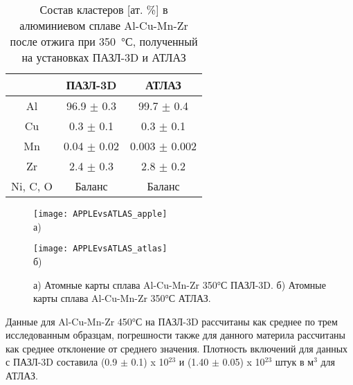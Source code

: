 \begin{table} [htbp]
	\centering
	\caption{Состав кластеров [ат. \%] в алюминиевом сплаве Al-Cu-Mn-Zr после отжига при 350~°С, полученный
		на установках ПАЗЛ-3D и АТЛАЗ}
	\label{tab:matrixAPPLEvsATLAS}
	\begin{SingleSpace}
		\begin{tabular} {| c | c | c |}
			\hline
			{} & ПАЗЛ-3D & АТЛАЗ \\ \hline
			Al       & 96.9 $\pm$ 0.3  & 99.7 $\pm$ 0.4   \\ \hline
			Cu       & 0.3 $\pm$ 0.1   & 0.3 $\pm$ 0.1    \\ \hline
			Mn       & 0.04 $\pm$ 0.02 & 0.003 $\pm$ 0.002  \\ \hline
			Zr       & 2.4 $\pm$ 0.3   & 2.8 $\pm$ 0.2    \\ \hline
			Ni, C, O & Баланс & Баланс   \\ \hline			
		\end{tabular}
	\end{SingleSpace}
\end{table}

\begin{figure}[h!tb]
	\begin{minipage}[b][][b]{0.49\textwidth}\centering
		\texttt{[image: APPLEvsATLAS\_apple]} \\ а)
	\end{minipage}
	\begin{minipage}[b][][b]{0.49\textwidth}\centering
		\texttt{[image: APPLEvsATLAS\_atlas]} \\ б)
	\end{minipage}
	\caption{а) Атомные карты сплава Al-Cu-Mn-Zr 350°С ПАЗЛ-3D. б) Атомные карты сплава Al-Cu-Mn-Zr 350°С АТЛАЗ.}
	\label{fig:APPLEvsATLAS}
\end{figure} 

Данные для Al-Cu-Mn-Zr 450°С на ПАЗЛ-3D рассчитаны как среднее по трем исследованным образцам, погрешности также для данного материла рассчитаны как среднее отклонение от среднего значения. Плотность включений для данных с ПАЗЛ-3D составила (0.9 $\pm$ 0.1) x 10$^{23}$ и (1.40 $\pm$ 0.05) x 10$^{23}$ штук в м$^3$ для АТЛАЗ.

